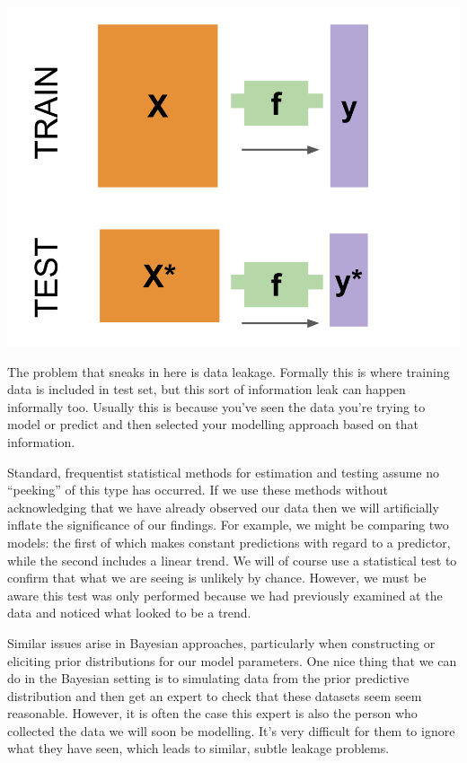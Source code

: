 \documentclass[
  12pt,
]{book}
\begin{document}
\includegraphics{images/302-data-exploration/supervise_learning_schematic.png}

The problem that sneaks in here is data leakage. Formally this is where training data is included in test set, but this sort of information leak can happen informally too. Usually this is because you've seen the data you're trying to model or predict and then selected your modelling approach based on that information.

Standard, frequentist statistical methods for estimation and testing assume no ``peeking'' of this type has occurred. If we use these methods without acknowledging that we have already observed our data then we will artificially inflate the significance of our findings. For example, we might be comparing two models: the first of which makes constant predictions with regard to a predictor, while the second includes a linear trend. We will of course use a statistical test to confirm that what we are seeing is unlikely by chance. However, we must be aware this test was only performed because we had previously examined at the data and noticed what looked to be a trend.

Similar issues arise in Bayesian approaches, particularly when constructing or eliciting prior distributions for our model parameters. One nice thing that we can do in the Bayesian setting is to simulating data from the prior predictive distribution and then get an expert to check that these datasets seem seem reasonable. However, it is often the case this expert is also the person who collected the data we will soon be modelling. It's very difficult for them to ignore what they have seen, which leads to similar, subtle leakage problems.
\end{document}
